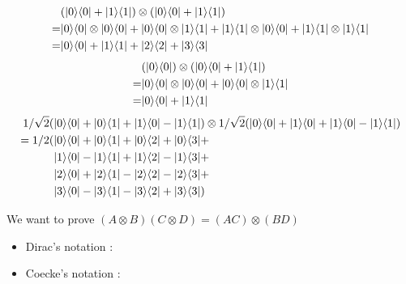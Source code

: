 \documentclass[12pt]{article}
\theoremstyle{exostyle}
\begin{document}
\begin{align*}
  &(| 0 \rangle \langle 0 | + | 1 \rangle \langle 1 |) \otimes (| 0 \rangle \langle 0 | + | 1 \rangle \langle 1 |) \\
  =& | 0 \rangle \langle 0 | \otimes | 0 \rangle \langle 0 | + | 0 \rangle \langle 0 | \otimes | 1 \rangle \langle 1 | +
  | 1 \rangle \langle 1 | \otimes | 0 \rangle \langle 0 | + | 1 \rangle \langle 1 | \otimes | 1 \rangle \langle 1 | \\
  =& | 0 \rangle \langle 0 | + | 1 \rangle \langle 1 | + | 2 \rangle \langle 2 | +| 3 \rangle \langle 3 |
\end{align*}
\begin{align*}
  &(| 0 \rangle \langle 0 |) \otimes (| 0 \rangle \langle 0 | + | 1 \rangle \langle 1 |) \\
  =& | 0 \rangle \langle 0 | \otimes | 0 \rangle \langle 0 | + | 0 \rangle \langle 0 | \otimes | 1 \rangle \langle 1 |
  \\
  =& | 0 \rangle \langle 0 | + | 1 \rangle \langle 1 |
\end{align*}
\begin{align*}
  1/\sqrt 2  (&| 0 \rangle \langle 0 | + | 0 \rangle \langle 1 | + | 1 \rangle \langle 0 | - | 1 \rangle \langle 1 | )
    \otimes 1/\sqrt 2 (| 0 \rangle \langle 0 | + | 1 \rangle \langle 0 | + | 1 \rangle \langle 0 | - | 1 \rangle
    \langle 1 |) \\
  =1/2 (&| 0 \rangle \langle 0 | + | 0 \rangle \langle 1 | + | 0 \rangle \langle 2 | + | 0 \rangle \langle 3 | + \\
   &| 1 \rangle \langle 0 | - | 1 \rangle \langle 1 | + | 1 \rangle \langle 2 | - | 1 \rangle \langle 3 | + \\
   &| 2 \rangle \langle 0 | + | 2 \rangle \langle 1 | - | 2 \rangle \langle 2 | - | 2 \rangle \langle 3 | + \\
   &| 3 \rangle \langle 0 | - | 3 \rangle \langle 1 | - | 3 \rangle \langle 2 | + | 3 \rangle \langle 3 |)
\end{align*}

\newpage

We want to prove $(A \otimes B) (C \otimes D) = (AC) \otimes (BD)$

\begin{itemize}
  \item Dirac's notation :

  \item Coecke's notation :

\end{itemize}

\end{document}

